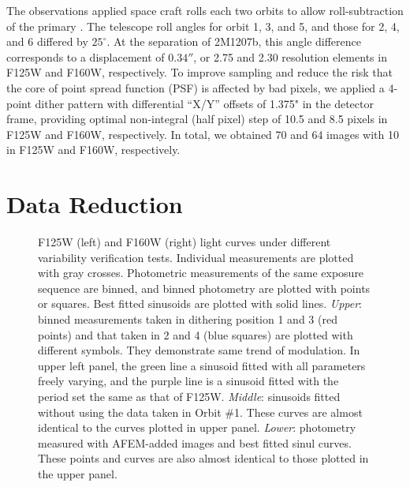 \documentclass[apj]{emulateapj}
\newcommand{\revise}[1]{\textit{\textbf{{\color{red}{#1}}}}}
\begin{document}
The observations applied space craft rolls each two orbits to allow
roll-subtraction of the primary \citep[e.g.][]{Song2006}. The
telescope roll angles for orbit 1, 3, and 5, and those for 2, 4, and 6
differed by $25^{\circ}$. At the separation of 2M1207b, this angle
difference corresponds to a displacement of $0.34''$, or 2.75 and 2.30
resolution elements in F125W and F160W, respectively.
\revise{In each orbit, we took 8 SPARS 10 exposure sequences
  alternating between F125W and F160W filters. Each sequence contained
  2--3 identical exposures that had 10 non-destructive read-outs and total
  exposure time of 88.4 s} To improve sampling and reduce the risk
that the core of point spread function (PSF) is affected by bad
pixels, we applied a 4-point dither pattern with differential ``X/Y''
offsets of 1.375" in the detector frame, providing optimal
non-integral (half pixel) step of 10.5 and 8.5 pixels in F125W and
F160W, respectively. In total, we obtained 70 and 64 images with 10 in
F125W and F160W, respectively.

\section{Data Reduction}

 \begin{figure}
  \centering
  \caption{F125W (left) and F160W (right) light curves under different
    variability verification tests. Individual measurements are
    plotted with gray crosses. Photometric measurements of the same exposure
    sequence are binned, and binned photometry are plotted with points
    or squares. Best fitted sinusoids are plotted with solid
    lines. {\em Upper}: binned measurements taken in dithering
    position 1 and 3 (red points) and that taken in 2 and 4 (blue
    squares) are plotted with different symbols. They demonstrate same
    trend of modulation. In upper left panel, the green line a sinusoid
    fitted with all parameters freely varying, and the purple line is
    a sinusoid fitted with the period set the same as that of
    F125W. {\em Middle}: sinusoids fitted without using the
    data taken in Orbit \#1. These curves are almost identical to the
    curves plotted in upper panel. {\em Lower}: photometry measured
    with AFEM-added images and best fitted sinul curves. These
    points and curves are also almost identical to those plotted
    in the upper panel.}
  \label{fig:2}
  
\end{figure}
\end{document}
